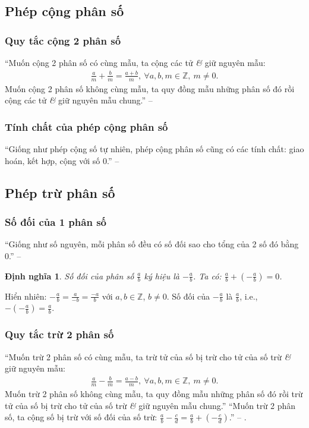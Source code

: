 \documentclass[oneside]{book}
\numberwithin{equation}{section}
\newtheorem{dinhnghia}{Định nghĩa}[section]
\begin{document}
\subsection{Phép cộng phân số}

\subsubsection{Quy tắc cộng 2 phân số}
``Muốn cộng 2 phân số có cùng mẫu, ta cộng các tử \textit{\&} giữ nguyên mẫu:
\begin{align*}
	\frac{a}{m} + \frac{b}{m} = \frac{a + b}{m},\ \forall a,b,m\in\mathbb{Z},\ m\ne 0.
\end{align*}
Muốn cộng 2 phân số không cùng mẫu, ta quy đồng mẫu những phân số đó rồi cộng các tử \textit{\&} giữ nguyên mẫu chung.'' -- \cite[pp. 34--35]{Thai_Anh_Dat_Ha_Loan_Nam_Quang_Toan_6_tap_2}

\subsubsection{Tính chất của phép cộng phân số}
``Giống như phép cộng số tự nhiên, phép cộng phân số cũng có các tính chất: giao hoán, kết hợp, cộng với số 0.'' -- \cite[pp. 35]{Thai_Anh_Dat_Ha_Loan_Nam_Quang_Toan_6_tap_2}

\subsection{Phép trừ phân số}

\subsubsection{Số đối của 1 phân số}
``Giống như số nguyên, mỗi phân số đều có số đối sao cho tổng của 2 số đó bằng 0.'' -- \cite[pp. 36]{Thai_Anh_Dat_Ha_Loan_Nam_Quang_Toan_6_tap_2}

\begin{dinhnghia}
	\emph{Số đối} của phân số $\frac{a}{b}$ ký hiệu là $-\frac{a}{b}$. Ta có: $\frac{a}{b} + \left(-\frac{a}{b}\right) = 0$.
\end{dinhnghia}
Hiển nhiên: $-\frac{a}{b} = \frac{a}{-b} = \frac{-a}{b}$ với $a,b\in\mathbb{Z}$, $b\ne 0$. Số đối của $-\frac{a}{b}$ là $\frac{a}{b}$, i.e., $-\left(-\frac{a}{b}\right) = \frac{a}{b}$.

\subsubsection{Quy tắc trừ 2 phân số}
``Muốn trừ 2 phân số có cùng mẫu, ta trừ tử của số bị trừ cho tử của số trừ \textit{\&} giữ nguyên mẫu:
\begin{align*}
	\frac{a}{m} - \frac{b}{m} = \frac{a - b}{m},\ \forall a,b,m\in\mathbb{Z},\ m\ne 0.
\end{align*}
Muốn trừ 2 phân số không cùng mẫu, ta quy đồng mẫu những phân số đó rồi trừ tử của số bị trừ cho tử của số trừ \textit{\&} giữ nguyên mẫu chung.'' ``Muốn trừ 2 phân số, ta cộng số bị trừ với số đối của số trừ: $\frac{a}{b} - \frac{c}{d} = \frac{a}{b} + \left(-\frac{c}{d}\right)$.'' -- \cite[pp. 36--37]{Thai_Anh_Dat_Ha_Loan_Nam_Quang_Toan_6_tap_2}.
\end{document}

